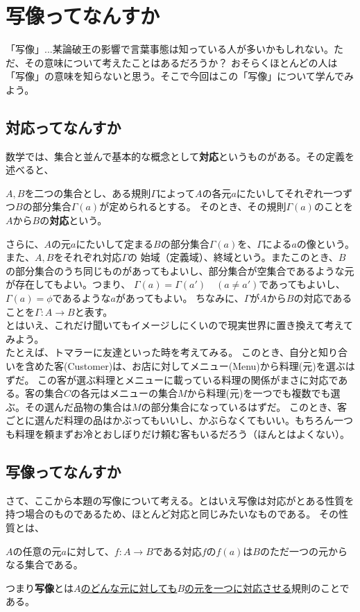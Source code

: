 \documentclass[a4j,dvipdfmx]{jsarticle}
\begin{document}
\section*{写像ってなんすか}
「写像」...某論破王の影響で言葉事態は知っている人が多いかもしれない。ただ、その意味について考えたことはあるだろうか？
おそらくほとんどの人は「写像」の意味を知らないと思う。そこで今回はこの「写像」について学んでみよう。
\subsection{対応ってなんすか}
数学では、集合と並んで基本的な概念として\textbf{対応}というものがある。その定義を述べると、
\begin{screen}
    $A,B$を二つの集合とし、ある規則$\Gamma$によって$A$の各元$a$にたいしてそれぞれ一つずつ$B$の部分集合$\Gamma(a)$が定められるとする。
    そのとき、その規則$\Gamma(a)$のことを$A$から$B$の\textbf{対応}という。
\end{screen}
さらに、$A$の元$a$にたいして定まる$B$の部分集合$\Gamma(a)$を、$\Gamma$による$a$の像という。また、$A,B$をそれぞれ対応$\Gamma$の
始域（定義域）、終域という。またこのとき、$B$の部分集合のうち同じものがあってもよいし、部分集合が空集合であるような元が存在してもよい。つまり、
$\Gamma(a)=\Gamma(a')\quad(a\neq a')$であってもよいし、$\Gamma(a)=\phi$であるような$a$があってもよい。
ちなみに、$\Gamma$が$A$から$B$の対応であることを$\Gamma:A\to B$と表す。\\

とはいえ、これだけ聞いてもイメージしにくいので現実世界に置き換えて考えてみよう。\\たとえば、トマラーに友達といった時を考えてみる。
このとき、自分と知り合いを含めた客(Customer)は、お店に対してメニュー(Menu)から料理(元)を選ぶはずだ。
この客が選ぶ料理とメニューに載っている料理の関係がまさに対応である。客の集合$C$の各元はメニューの集合$M$から料理(元)を一つでも複数でも選ぶ。その選んだ品物の集合は$M$の部分集合になっているはずだ。
このとき、客ごとに選んだ料理の品はかぶってもいいし、かぶらなくてもいい。もちろん一つも料理を頼まずお冷とおしぼりだけ頼む客もいるだろう（ほんとはよくない）。
\subsection{写像ってなんすか}
さて、ここから本題の写像について考える。とはいえ写像は対応がとある性質を持つ場合のものであるため、ほとんど対応と同じみたいなものである。
その性質とは、
\begin{screen}
    $A$の任意の元$a$に対して、$f:A\to B$である対応$f$の$f(a)$は$B$のただ一つの元からなる集合である。
\end{screen}
つまり\textbf{写像}とは\underline{$A$のどんな元に対しても$B$の元を一つに対応させる}規則のことである。\\
\end{document}
